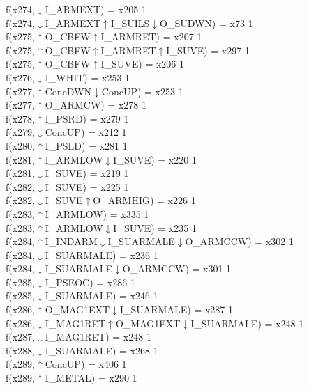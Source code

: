 f(x274,$\downarrow$I\_ARMEXT) = x205 {1} \\
f(x274,$\downarrow$I\_ARMEXT$\uparrow$I\_SUILS$\downarrow$O\_SUDWN) = x73 {1} \\
f(x275,$\uparrow$O\_CBFW$\uparrow$I\_ARMRET) = x207 {1} \\
f(x275,$\uparrow$O\_CBFW$\uparrow$I\_ARMRET$\uparrow$I\_SUVE) = x297 {1} \\
f(x275,$\uparrow$O\_CBFW$\uparrow$I\_SUVE) = x206 {1} \\
f(x276,$\downarrow$I\_WHIT) = x253 {1} \\
f(x277,$\uparrow$ConcDWN$\downarrow$ConcUP) = x253 {1} \\
f(x277,$\uparrow$O\_ARMCW) = x278 {1} \\
f(x278,$\uparrow$I\_PSRD) = x279 {1} \\
f(x279,$\downarrow$ConcUP) = x212 {1} \\
f(x280,$\uparrow$I\_PSLD) = x281 {1} \\
f(x281,$\uparrow$I\_ARMLOW$\downarrow$I\_SUVE) = x220 {1} \\
f(x281,$\downarrow$I\_SUVE) = x219 {1} \\
f(x282,$\downarrow$I\_SUVE) = x225 {1} \\
f(x282,$\downarrow$I\_SUVE$\uparrow$O\_ARMHIG) = x226 {1} \\
f(x283,$\uparrow$I\_ARMLOW) = x335 {1} \\
f(x283,$\uparrow$I\_ARMLOW$\downarrow$I\_SUVE) = x235 {1} \\
f(x284,$\uparrow$I\_INDARM$\downarrow$I\_SUARMALE$\downarrow$O\_ARMCCW) = x302 {1} \\
f(x284,$\downarrow$I\_SUARMALE) = x236 {1} \\
f(x284,$\downarrow$I\_SUARMALE$\downarrow$O\_ARMCCW) = x301 {1} \\
f(x285,$\downarrow$I\_PSEOC) = x286 {1} \\
f(x285,$\downarrow$I\_SUARMALE) = x246 {1} \\
f(x286,$\uparrow$O\_MAG1EXT$\downarrow$I\_SUARMALE) = x287 {1} \\
f(x286,$\downarrow$I\_MAG1RET$\uparrow$O\_MAG1EXT$\downarrow$I\_SUARMALE) = x248 {1} \\
f(x287,$\downarrow$I\_MAG1RET) = x248 {1} \\
f(x288,$\downarrow$I\_SUARMALE) = x268 {1} \\
f(x289,$\uparrow$ConcUP) = x406 {1} \\
f(x289,$\uparrow$I\_METAL) = x290 {1} \\
